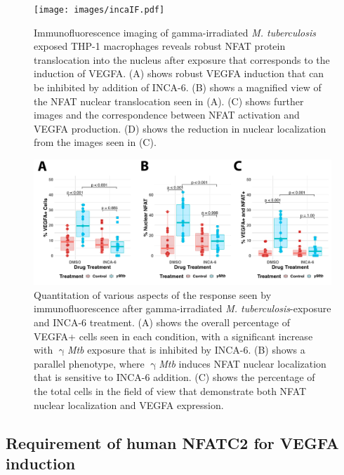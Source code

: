 \begin{figure}
\centering
\texttt{[image: images/incaIF.pdf]}
\caption[Immunofluorescence of $\upgamma$-\textit{Mtb}-exposed THP-1 macrophages]{Immunofluorescence imaging of gamma\hyp{}irradiated \textit{M. tuberculosis} exposed THP\hyp{}1 macrophages reveals robust NFAT protein translocation into the nucleus after exposure that corresponds to the induction of VEGFA. (A) shows robust VEGFA induction that can be inhibited by addition of INCA\hyp{}6. (B) shows a magnified view of the NFAT nuclear translocation seen in (A). (C) shows further images and the correspondence between NFAT activation and VEGFA production. (D) shows the reduction in nuclear localization from the images seen in (C).}
\label{figure:incaif}

\end{figure}

\begin{figure}
\centering
\includegraphics[width=\textwidth]{images/incaIFquant.pdf}
\caption[Quantitation of THP-1 macrophage immunofluorescence with NFAT inhibition]{Quantitation of various aspects of the response seen by immunofluorescence after gamma\hyp{}irradiated \textit{M. tuberculosis}\hyp{}exposure and INCA\hyp{}6 treatment. (A) shows the overall percentage of VEGFA+ cells seen in each condition, with a significant increase with $\upgamma$\textit{Mtb} exposure that is inhibited by INCA\hyp{}6. (B) shows a parallel phenotype, where $\upgamma$\textit{Mtb} induces NFAT nuclear localization that is sensitive to INCA\hyp{}6 addition. (C) shows the percentage of the total cells in the field of view that demonstrate both NFAT nuclear localization and VEGFA expression.}
\label{figure:incaquant}
\end{figure}

\subsection{Requirement of human NFATC2 for VEGFA induction}\label{thp1lenti}

